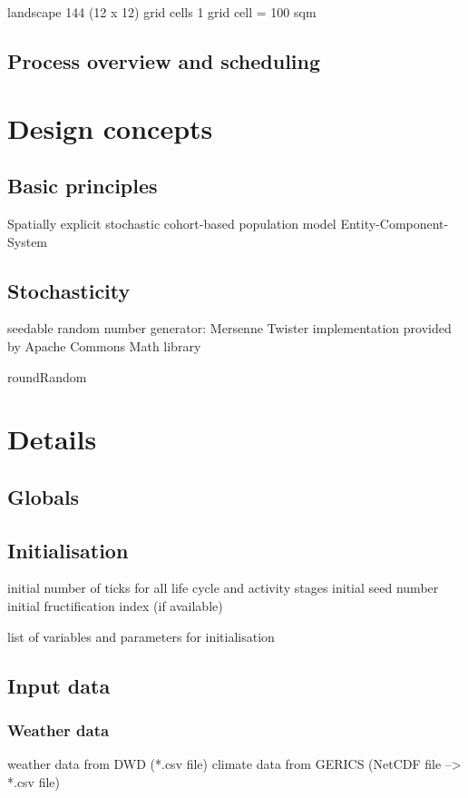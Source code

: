 \documentclass[a4paper, 11pt]{scrartcl}
\begin{document}
landscape 144 (12 x 12) grid cells
1 grid cell = 100 sqm 


\subsection{Process overview and scheduling}

\section{Design concepts}

\subsection{Basic principles}
Spatially explicit stochastic cohort-based population model
Entity-Component-System


\subsection{Stochasticity}
seedable random number generator: 
Mersenne Twister implementation 
provided by Apache Commons Math library

roundRandom


\section{Details}

\subsection{Globals}


\subsection{Initialisation}
initial number of ticks for all life cycle and activity stages 
initial seed number
initial fructification index (if available)

list of variables and parameters for initialisation


\subsection{Input data}

\subsubsection{Weather data}
weather data from DWD (*.csv file)
climate data from GERICS (NetCDF file --> *.csv file) 
\end{document}
